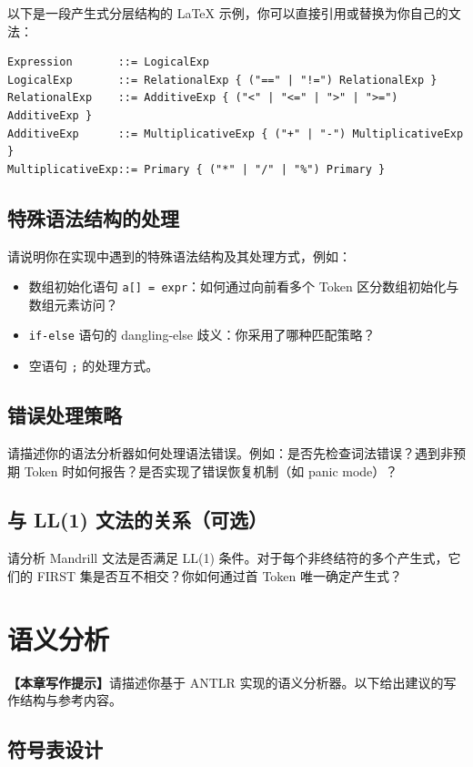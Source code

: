 \documentclass[12pt,hyperref,a4paper,UTF8]{ctexart}
\begin{document}
以下是一段产生式分层结构的 LaTeX 示例，你可以直接引用或替换为你自己的文法：
\begin{verbatim}
Expression       ::= LogicalExp
LogicalExp       ::= RelationalExp { ("==" | "!=") RelationalExp }
RelationalExp    ::= AdditiveExp { ("<" | "<=" | ">" | ">=") AdditiveExp }
AdditiveExp      ::= MultiplicativeExp { ("+" | "-") MultiplicativeExp }
MultiplicativeExp::= Primary { ("*" | "/" | "%") Primary }
\end{verbatim}

\subsection{特殊语法结构的处理}

请说明你在实现中遇到的特殊语法结构及其处理方式，例如：
\begin{itemize}
    \item 数组初始化语句 \texttt{a[] = expr}：如何通过向前看多个 Token 区分数组初始化与数组元素访问？
    \item \texttt{if-else} 语句的 dangling-else 歧义：你采用了哪种匹配策略？
    \item 空语句 \texttt{;} 的处理方式。
\end{itemize}

\subsection{错误处理策略}

请描述你的语法分析器如何处理语法错误。例如：是否先检查词法错误？遇到非预期 Token 时如何报告？是否实现了错误恢复机制（如 panic mode）？

\subsection{与 LL(1) 文法的关系（可选）}

请分析 Mandrill 文法是否满足 LL(1) 条件。对于每个非终结符的多个产生式，它们的 FIRST 集是否互不相交？你如何通过首 Token 唯一确定产生式？

\section{语义分析}

\textbf{【本章写作提示】}请描述你基于 ANTLR 实现的语义分析器。以下给出建议的写作结构与参考内容。

\subsection{符号表设计}
\end{document}
